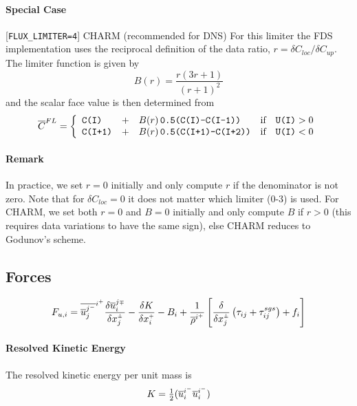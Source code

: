 \documentclass[11pt]{article}
\begin{document}
\paragraph{Special Case} [{\tt FLUX\_LIMITER=4}] CHARM (recommended for DNS) For this limiter the FDS implementation uses the reciprocal definition of the data ratio, $r = \delta C_{loc}/\delta C_{up}$.  The limiter function is given by \cite{Zhou,Kempf}
\begin{equation}
B(r) = \frac{r(3r+1)}{(r+1)^2}
\end{equation}
and the scalar face value is then determined from
\begin{equation}
\label{eqn_charm_limiter}
\overline{C}^{\tiny FL} = \left\{ \begin{array}{lcll} \mbox{\tt C(I)} &+& B(r) \,\mbox{\tt 0.5(C(I)-C(I-1))} & \mbox{if} \quad \mbox{\tt U(I)}>0 \\
\mbox{\tt C(I+1)} &+& B(r) \,\mbox{\tt 0.5(C(I+1)-C(I+2))} & \mbox{if} \quad \mbox{\tt U(I)}<0 \end{array} \right.
\end{equation}

\paragraph{Remark} In practice, we set $r=0$ initially and only compute $r$ if the denominator is not zero.  Note that for $\delta C_{loc}=0$ it does not matter which limiter (0-3) is used.  For CHARM, we set both $r=0$ and $B=0$ initially and only compute $B$ if $r>0$ (this requires data variations to have the same sign), else CHARM reduces to Godunov's scheme.

\subsection{Forces}

\begin{equation}
\label{eqn_force}
F_{u,i} = \overline{\overline{u}_j^{j^-}}^{i^+} \frac{\delta \overline{u}_i^{j{\scriptscriptstyle \mp}}}{\delta x_j^{\scriptscriptstyle \pm}} - \frac{\delta K}{\delta x_i^{\scriptscriptstyle +}} - B_i + \frac{1}{\overline{\rho}^{i^+}} \left[ \frac{\delta}{\delta x_j^{\scriptscriptstyle \pm}} \left( \tau_{ij} + \tau_{ij}^{sgs} \right) + f_i \right]
\end{equation}

\paragraph{Resolved Kinetic Energy} The resolved kinetic energy per unit mass is
\begin{equation}
\label{eqn_ke}
K = \mbox{$\frac{1}{2}$} ( \overline{u}_i^{i^-}\overline{u}_i^{i^-} )
\end{equation}
\end{document}
